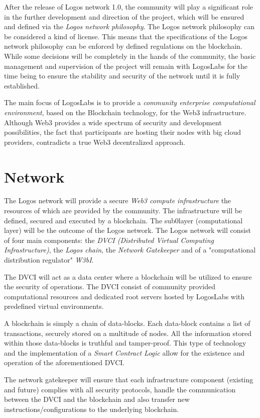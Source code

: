 \documentclass[]{article}
\begin{document}
After the release of Logos network 1.0, the community will play a significant role in the further development and direction of the project, which will be ensured and defined via the \textit{Logos network philosophy}.
The Logos network philosophy can be considered a kind of license.
This means that the specifications of the Logos network philosophy can be enforced by defined regulations on the blockchain.
While some decisions will be completely in the hands of the community, the basic management and supervision of the project will remain with LogosLabs for the time being to ensure the stability and security of the network until it is fully established.

The main focus of LogosLabs is to provide a \textit{community enterprise computational environment}, based on the Blockchain technology, for the Web3 infrastructure.
Although Web3 provides a wide spectrum of security and development possibilities, the fact that participants are hosting their nodes with big cloud providers, contradicts a true Web3 decentralized approach.

\section{Network}
The Logos network will provide a secure \textit{Web3 compute infrastructure} the resources of which are provided by the community.
The infrastructure will be defined, secured and executed by a blockchain.
The sub0layer (computational layer) will be the outcome of the Logos network.
The Logos network will consist of four main components: the \textit{DVCI (Distributed Virtual Computing Infrastructure)}, the \textit{Logos chain}, the \textit{Network Gatekeeper} and of a "computational distribution regulator" \textit{W3bI}. 

The DVCI will act as a data center where a blockchain will be utilized to ensure the security of operations.
The DVCI consist of community provided computational resources and dedicated root servers hosted by LogosLabs with predefined virtual environments.

A blockchain is simply a chain of data-blocks.
Each data-block contains a list of transactions, securely stored on a multitude of nodes. 
All the information stored within those data-blocks is truthful and tamper-proof.
This type of technology and the implementation of a \textit{Smart Contract Logic} allow for the existence and operation of the aforementioned DVCI.

The network gatekeeper will ensure that each infrastructure component (existing and future) complies with all security protocols, handle the communication between the DVCI and the blockchain and also transfer new instructions/configurations to the underlying blockchain.
\end{document}
